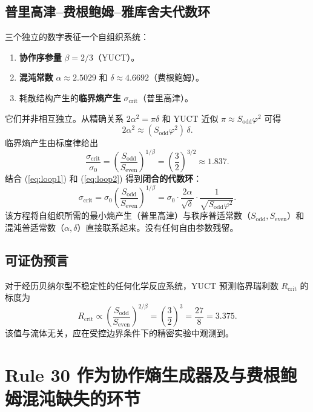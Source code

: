 \documentclass[12pt,a4paper]{article}
\begin{document}
	\subsection{普里高津–费根鲍姆–雅库舍夫代数环}
	
	三个独立的数字表征一个自组织系统：
	\begin{enumerate}
		\item \textbf{协作序参量} \(\beta = 2/3\)（YUCT）。
		\item \textbf{混沌常数} \(\alpha \approx 2.5029\) 和 \(\delta \approx 4.6692\)（费根鲍姆）。
		\item 耗散结构产生的\textbf{临界熵产生} \(\sigma_{\mathrm{crit}}\)（普里高津）。
	\end{enumerate}
	它们并非相互独立。从精确关系 \(2\alpha^2 = \pi\delta\) 和 YUCT 近似 \(\pi \approx S_{\mathrm{odd}}\varphi^2\) 可得
	\begin{equation}
		2\alpha^2 \approx (S_{\mathrm{odd}}\varphi^2)\,\delta .
		\label{eq:loop1}
	\end{equation}
	临界熵产生由标度律给出
	\begin{equation}
		\frac{\sigma_{\mathrm{crit}}}{\sigma_0} = \left( \frac{S_{\mathrm{odd}}}{S_{\mathrm{even}}} \right)^{1/\beta}
		= \left( \frac{3}{2} \right)^{3/2} \approx 1.837 .
		\label{eq:loop2}
	\end{equation}
	结合 (\ref{eq:loop1}) 和 (\ref{eq:loop2}) 得到\textbf{闭合的代数环}：
	\[
	\boxed{
		\sigma_{\mathrm{crit}} = \sigma_0 \left( \frac{S_{\mathrm{odd}}}{S_{\mathrm{even}}} \right)^{1/\beta}
		= \sigma_0 \cdot \frac{2\alpha}{\sqrt{\delta}} \cdot \frac{1}{\sqrt{S_{\mathrm{odd}}\varphi^2}} .
	}
	\]
	该方程将自组织所需的最小熵产生（普里高津）与秩序普适常数（\(S_{\mathrm{odd}},S_{\mathrm{even}}\)）和混沌普适常数（\(\alpha,\delta\)）直接联系起来。没有任何自由参数残留。
	
	\subsection{可证伪预言}
	
	对于经历贝纳尔型不稳定性的任何化学反应系统，YUCT 预测临界瑞利数 \(R_{\mathrm{crit}}\) 的标度为
	\[
	R_{\mathrm{crit}} \propto \left( \frac{S_{\mathrm{odd}}}{S_{\mathrm{even}}} \right)^{2/\beta}
	= \left( \frac{3}{2} \right)^3 = \frac{27}{8} = 3.375 .
	\]
	该值与流体无关，应在受控边界条件下的精密实验中观测到。
	
	\section{Rule 30 作为协作熵生成器及与费根鲍姆混沌缺失的环节}
	\label{sec:rule30}
	
\end{document}

